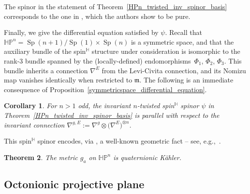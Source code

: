 \documentclass[pdftex]{sigma}
\numberwithin{equation}{section}
\newtheorem{Theorem}{Theorem}[section]
\newtheorem{Corollary}[Theorem]{Corollary}
\DeclareMathOperator{\Sp}{Sp}
\begin{document}
\begin{Remark}
The spinor in the statement of Theorem~\ref{HPn_twisted_inv_spinor_basis} corresponds to the one in \cite[Section~3.4.1]{ES19}, which the authors show to be pure.
\end{Remark}
		
		Finally, we give the differential equation satisfied by $\psi$. Recall that $\mathbb{HP}^n=\Sp(n+1)/\Sp(1)\times \Sp(n)$ is a symmetric space, and that the auxiliary bundle of the spin$^{\mathbb{H}}$ structure under consideration is isomorphic to the rank-$3$ bundle spanned by the (locally-defined) endomorphisms~$\Phi_1$, $\Phi_2$, $\Phi_3$. This bundle inherits a connection $\nabla^E$ from the Levi-Civita connection, and its Nomizu map vanishes identically when restricted to $\mathfrak{m}$. The following is an immediate consequence of Proposition~\ref{symmetricspace_differential_equation}.

		\begin{Corollary}
			For $n > 1$ odd, the invariant $n$-twisted spin$^{\mathbb{H}}$ spinor $\psi$ in Theorem~{\rm\ref{HPn_twisted_inv_spinor_basis}} is parallel with respect to the invariant connection $\nabla^{g,E}:=\nabla^g \otimes\bigl(\nabla^E\bigr)^{\otimes n}$.
		\end{Corollary}
		This spin$^{\mathbb{H}}$ spinor encodes, via \cite[Corollary~4.12]{ES19}, a well-known geometric fact -- see, e.g.,~\cite{besse}.

		\begin{Theorem}
			The metric $g_a$ on $\mathbb{HP}^n$ is quaternionic K\"{a}hler.
		\end{Theorem}
		
		\subsection{Octonionic projective plane}\label{section:op2}
		
\end{document}
